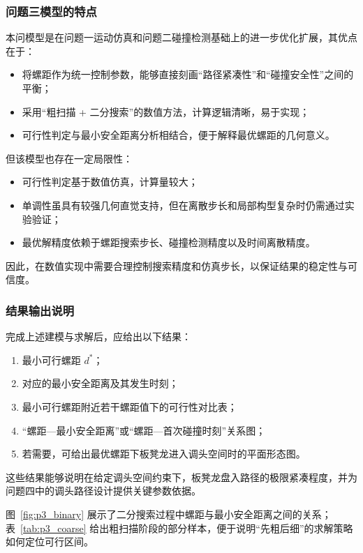 \documentclass[12pt,a4paper]{ctexart}
\begin{document}
\subsubsection{问题三模型的特点}
本问模型是在问题一运动仿真和问题二碰撞检测基础上的进一步优化扩展，其优点在于：

\begin{itemize}
    \item 将螺距作为统一控制参数，能够直接刻画“路径紧凑性”和“碰撞安全性”之间的平衡；
    \item 采用“粗扫描 + 二分搜索”的数值方法，计算逻辑清晰，易于实现；
    \item 可行性判定与最小安全距离分析相结合，便于解释最优螺距的几何意义。
\end{itemize}

但该模型也存在一定局限性：

\begin{itemize}
    \item 可行性判定基于数值仿真，计算量较大；
    \item 单调性虽具有较强几何直觉支持，但在离散步长和局部构型复杂时仍需通过实验验证；
    \item 最优解精度依赖于螺距搜索步长、碰撞检测精度以及时间离散精度。
\end{itemize}

因此，在数值实现中需要合理控制搜索精度和仿真步长，以保证结果的稳定性与可信度。

\subsubsection{结果输出说明}
完成上述建模与求解后，应给出以下结果：

\begin{enumerate}
    \item 最小可行螺距 $d^\ast$；
    \item 对应的最小安全距离及其发生时刻；
    \item 最小可行螺距附近若干螺距值下的可行性对比表；
    \item “螺距—最小安全距离”或“螺距—首次碰撞时刻”关系图；
    \item 若需要，可给出最优螺距下板凳龙进入调头空间时的平面形态图。
\end{enumerate}

\noindent 这些结果能够说明在给定调头空间约束下，板凳龙盘入路径的极限紧凑程度，并为问题四中的调头路径设计提供关键参数依据。

图~\ref{fig:p3_binary} 展示了二分搜索过程中螺距与最小安全距离之间的关系；表~\ref{tab:p3_coarse} 给出粗扫描阶段的部分样本，便于说明“先粗后细”的求解策略如何定位可行区间。
\end{document}
